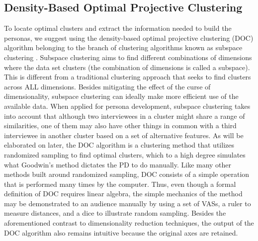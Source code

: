 
\subsection{Density-Based Optimal Projective Clustering}

To locate optimal clusters and extract the information needed to build the personas, we suggest using the density-based optimal projective clustering (DOC) algorithm \citep{Procopiuc2002} belonging to the branch of clustering algorithms known as subspace clustering \citep{Parsons2004, Muller2009}. Subspace clustering aims to find different combinations of dimensions where the data set clusters (the combination of dimensions is called a subspace). This is different from a traditional clustering approach that seeks to find clusters across ALL dimensions. Besides mitigating the effect of the curse of dimensionality, subspace clustering can ideally make more efficient use of the available data. When applied for persona development, subspace clustering takes into account that although two interviewees in a cluster might share a range of similarities, one of them may also have other things in common with a third interviewee in another cluster based on a set of alternative features. As will be elaborated on later, the DOC algorithm is a clustering method that utilizes randomized sampling to find optimal clusters, which to a high degree simulates what Goodwin's method dictates the PD to do manually. Like many other methods built around randomized sampling, DOC consists of a simple operation that is performed many times by the computer. Thus, even though a formal definition of DOC requires linear algebra, the simple mechanics of the method may be demonstrated to an audience manually by using a set of VASs, a ruler to measure distances, and a dice to illustrate random sampling. Besides the aforementioned contrast to dimensionality reduction techniques, the output of the DOC algorithm also remains intuitive because the original axes are retained.

